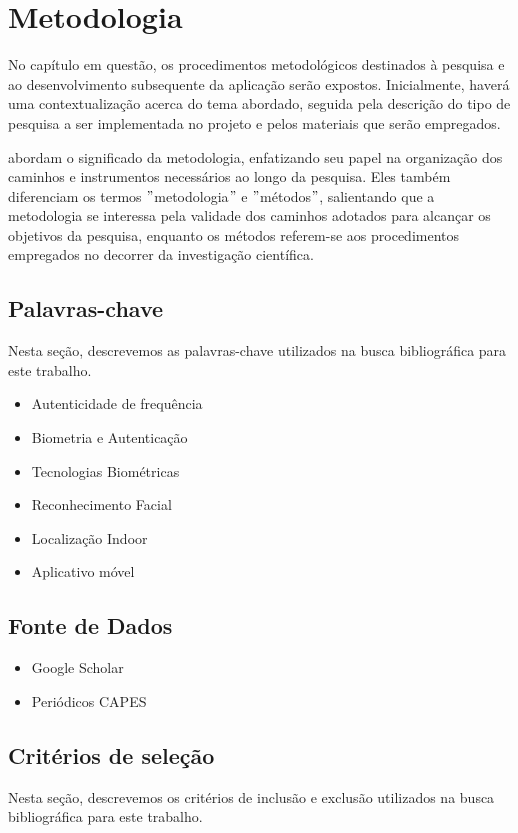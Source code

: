 \chapter{Metodologia}\label{ch:metodologia}
No capítulo em questão, os procedimentos metodológicos destinados à pesquisa e ao desenvolvimento subsequente da aplicação serão expostos.
Inicialmente, haverá uma contextualização acerca do tema abordado, seguida pela descrição do tipo de pesquisa a ser implementada no projeto e pelos materiais que serão empregados.

 \cite[pp. 10--15]{gerhardt2009metodos} abordam o significado da metodologia, enfatizando seu papel na organização dos caminhos e instrumentos necessários ao longo da pesquisa.
Eles também diferenciam os termos \("\)metodologia\("\) e \("\)métodos\("\), salientando que a metodologia se interessa pela validade dos caminhos adotados para alcançar os objetivos da pesquisa, enquanto os métodos referem-se aos procedimentos empregados no decorrer da investigação científica.


\section{Palavras-chave}\label{sec:palavras-chave}
Nesta seção, descrevemos as palavras-chave utilizados na busca bibliográfica para este trabalho.

\begin{itemize}
    \item Autenticidade de frequência
    \item Biometria e Autenticação
    \item Tecnologias Biométricas
    \item Reconhecimento Facial
    \item Localização Indoor
    \item Aplicativo móvel
\end{itemize}


\section{Fonte de Dados}\label{sec:fonte-dados}
\begin{itemize}
    \item Google Scholar
    \item Periódicos CAPES
\end{itemize}


\section{Critérios de seleção}\label{sec:criterios-de-inclusao}
Nesta seção, descrevemos os critérios de inclusão e exclusão utilizados na busca bibliográfica para este trabalho.


